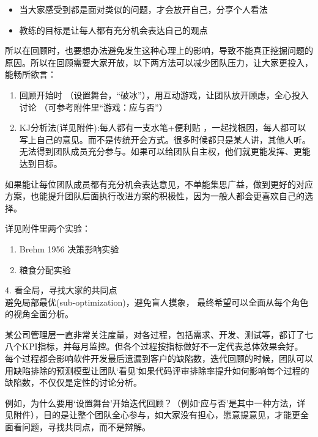 \begin{itemize}
\tightlist
\item
  当大家感受到都是面对类似的问题，才会放开自己，分享个人看法
\item
  教练的目标是让每人都有充分机会表达自己的观点
\end{itemize}

所以在回顾时，也要想办法避免发生这种心理上的影响，导致不能真正挖掘问题的原因。所以在回顾需要大家开放，以下两方法可以减少团队压力，让大家更投入，能畅所欲言：

\begin{enumerate}
\tightlist
\item
  回顾开始时
  （设置舞台，``破冰''），用互动游戏，让团队放开顾虑，全心投入讨论
  （可参考附件里``游戏：应与否''）
\item
  KJ分析法(详见附件):每人都有一支水笔+便利贴 ，一起找根因，每人都可以写上自己的意见。而不是传统开会方式。很多时候都只是某人讲，其他人听。无法得到团队成员充分参与。如果可以给团队自主权，他们就更能发挥、更能达到目标。\\
\end{enumerate}

如果能让每位团队成员都有充分机会表达意见，不单能集思广益，做到更好的对应方案，也能提升团队后面执行改进方案的积极性，因为一般人都会更喜欢自己的选择。

详见附件里两个实验：

\begin{enumerate}
\tightlist
\item
  Brehm 1956 决策影响实验
\item
  粮食分配实验
\end{enumerate}


4. 看全局，寻找大家的共同点\\
避免局部最优(sub-optimization)，避免盲人摸象，
最终希望可以全面从每个角色的视角全面分析。

某公司管理层一直非常关注度量，对各过程，包括需求、开发、测试等，都订了七八个KPI指标，并每月监控。但各个过程按指标做好不一定代表总体效果会好。
每个过程都会影响软件开发最后遗漏到客户的缺陷数，迭代回顾的时候，团队可以用缺陷排除的预测模型让团队`看见'如果代码评审排除率提升如何影响每个过程的缺陷数，不仅仅是定性的讨论分析。

例如，为什么要用`设置舞台'开始迭代回顾？（例如`应与否'是其中一种方法，详见附件），目的是让整个团队全心参与，如大家没有担心，愿意提意见，才能更全面看问题，寻找共同点，而不是辩解。

